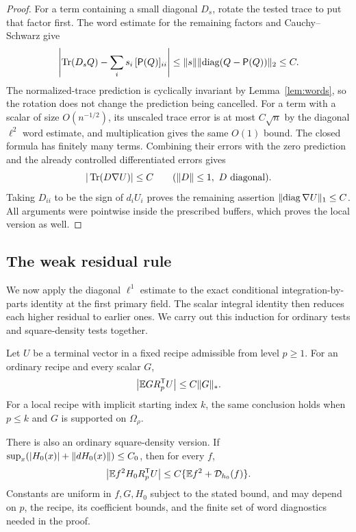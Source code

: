 \begin{proof}
For a term containing a small diagonal $D_s$, rotate the tested trace
to put that factor first.  The word estimate for the remaining factors
and Cauchy--Schwarz give
\[
 \left|\operatorname{Tr}(D_sQ)-\sum_i s_i\,[\mathsf P(Q)]_{ii}\right|
 \leq\lVert s\rVert\lVert \operatorname{diag}(Q-\mathsf P(Q))\rVert_2\leq C.
\]
The normalized-trace prediction is cyclically invariant by
Lemma~\ref{lem:words}, so the rotation does not change the prediction
being cancelled.  For a term with a scalar of size $O(n^{-1/2})$, its
unscaled trace error is at most $C\sqrt n$ by the diagonal $\ell^2$
word estimate, and multiplication gives the same $O(1)$ bound.
The closed formula has finitely many terms. Combining their errors
with the zero prediction and the already controlled differentiated errors
gives
\[
 |\operatorname{Tr}(D\nabla U)|\leq C\qquad(\lVert D\rVert\leq1,\ D\text{ diagonal}).
\]
Taking $D_{ii}$ to be the sign of $d_iU_i$ proves the remaining assertion
$\lVert \operatorname{diag}\nabla U\rVert_1\leq C$.  All arguments were pointwise inside
the prescribed buffers, which proves the local version as well.
\end{proof}

\subsection{The weak residual rule}

We now apply the diagonal $\ell^1$ estimate to the exact conditional
integration-by-parts identity at the first primary field. The scalar
integral identity then reduces each higher residual to earlier ones.
We carry out this induction for ordinary tests and square-density tests
together.

\begin{lemma}\label{lem:residual}
Let $U$ be a terminal vector in a fixed recipe admissible from level
$p\geq1$.  For an ordinary recipe and every scalar $G$,
\begin{equation}
 \left|\mathbb E G R_p^{\mathsf T}U\right|\leq C\lVert G\rVert_*.
 \label{eq:weak-residual}
\end{equation}
For a local recipe with implicit starting index $k$, the same conclusion
holds when $p\leq k$ and $G$ is supported on $\Omega_\rho$.

There is also an ordinary square-density version.  If
$\sup_x(|H_0(x)|+\lVert dH_0(x)\rVert)\leq C_0$, then for every $f$,
\begin{equation}
 \left|\mathbb E f^2H_0 R_p^{\mathsf T}U\right|
       \leq C\{\mathbb E f^2+\mathcal D_{h_0}(f)\}.
 \label{eq:square-residual}
\end{equation}
Constants are uniform in $f,G,H_0$ subject to the stated bound, and may
depend on $p$, the recipe, its coefficient bounds, and the finite set of
word diagnostics needed in the proof.
\end{lemma}

